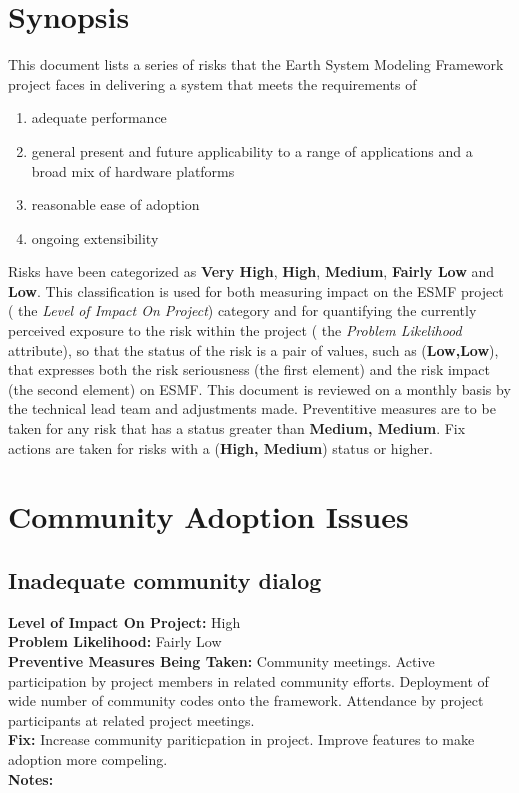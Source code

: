 \documentclass[english]{article}
\newcommand{\req}[1]{\section{\hspace{.2in}#1}}
\newcommand{\sreq}[1]{\subsection{\hspace{.2in}#1}}
\newenvironment
{reqlist}
{\begin{list} {} {} \rm \item[]}
{\end{list}}
\begin{document}




\newpage
\tableofcontents

\newpage
\section{Synopsis}

This document lists a series of risks that the Earth System Modeling Framework project faces
in delivering a system that meets the requirements of 

\begin{enumerate}
\item adequate performance
\item general present and future applicability to a range of applications and a broad mix of hardware platforms
\item reasonable ease of adoption
\item ongoing extensibility
\end{enumerate}

Risks have been categorized as {\bf Very High}, {\bf High}, {\bf Medium}, {\bf Fairly Low} and {\bf Low}.
This classification is used for both measuring impact on the ESMF project ( the {\it Level of Impact On Project})
category and for quantifying the currently perceived exposure to the risk within
the project ( the {\it Problem Likelihood} attribute), so that the
status of the risk is a pair of values, such as ({\bf Low,Low}), that expresses
both the risk seriousness (the first element) and the risk impact (the second element) on
ESMF.  This document is reviewed on a monthly basis by the technical lead team and adjustments
made. Preventitive measures are to be taken for any risk that has a status greater than {\bf Medium, Medium}.
Fix actions are taken for risks with a ({\bf High, Medium}) status or higher.

\req{Community Adoption Issues}
\sreq{Inadequate community dialog}
\begin{reqlist}
{\bf Level of Impact On Project:}  High \\
{\bf Problem Likelihood:} Fairly Low\\
{\bf Preventive Measures Being Taken:} Community meetings. Active participation by project
members in related community efforts. Deployment of wide number of community codes
onto the framework. Attendance by project participants at related project
meetings.\\
{\bf Fix:} Increase community pariticpation in project. Improve features to make
adoption more compeling.\\
{\bf Notes:} \\
\end{reqlist}
\end{document}
